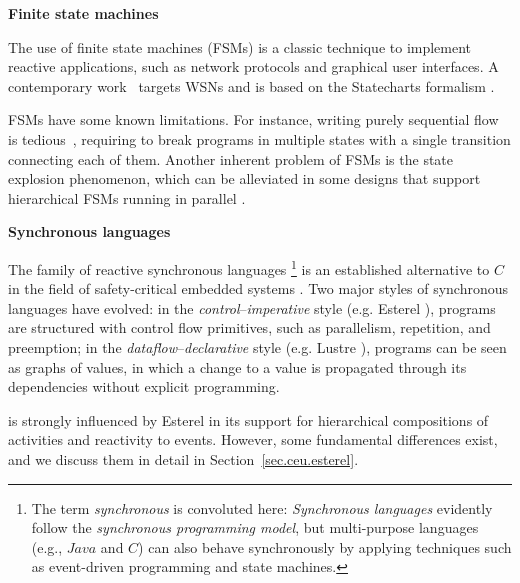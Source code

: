 \textbf{Finite state machines}

The use of finite state machines (FSMs) is a classic technique to implement
reactive applications, such as network protocols and graphical user interfaces.
A contemporary work~\cite{wsn.osm} targets WSNs and is based on the Statecharts 
formalism \cite{statecharts.visual}.

FSMs have some known limitations.
For instance, writing purely sequential flow is tedious~\cite{wsn.osm}, 
requiring to break programs in multiple states with a single transition 
connecting each of them.  Another inherent problem of FSMs is the state 
explosion phenomenon, which can be alleviated in some designs that support 
hierarchical FSMs running in parallel \cite{wsn.osm}.



\textbf{Synchronous languages}

The family of reactive synchronous languages%
\footnote{
The term \emph{synchronous} is convoluted here:
\emph{Synchronous languages} evidently follow the \emph{synchronous programming 
model}, but multi-purpose languages (e.g., $Java$ and $C$) can also behave 
synchronously by applying techniques such as event-driven programming and state 
machines.
}
is an established alternative to $C$ in the field of safety-critical embedded 
systems \cite{rp.twelve}.
%
Two major styles of synchronous languages have evolved:
in the \emph{control}--\emph{imperative} style (e.g. Esterel 
\cite{esterel.ieee91}), programs are structured with control flow primitives, 
such as parallelism, repetition, and preemption;
in the \emph{dataflow}--\emph{declarative} style (e.g. Lustre 
\cite{lustre.ieee91}), programs can be seen as graphs of values, in which a 
change to a value is propagated through its dependencies without explicit 
programming.

\CEU is strongly influenced by Esterel in its support for hierarchical 
compositions of activities and reactivity to events.
%
However, some fundamental differences exist, and we discuss them in detail in
Section~\ref{sec.ceu.esterel}.

